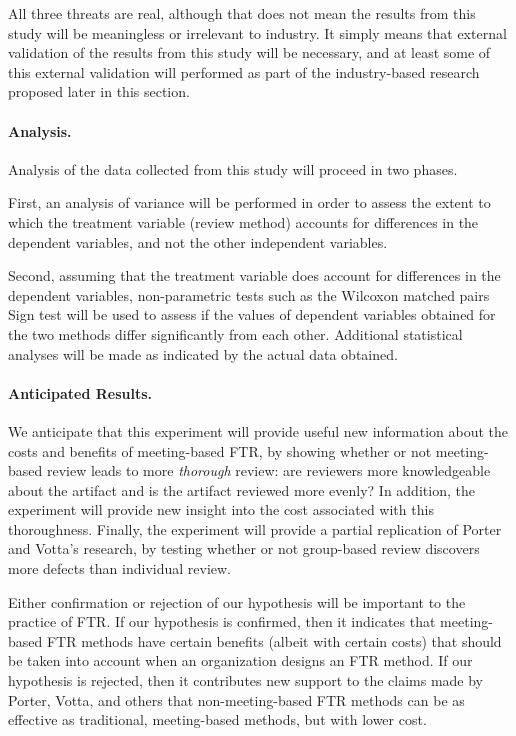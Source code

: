 All three threats are real, although that does not mean the results
from this study will be meaningless or irrelevant to industry.  It simply 
means that external validation of the results from this study will be
necessary, and at least some of this external validation will performed as 
part of the industry-based research proposed later in this section.

\paragraph {Analysis.}

Analysis of the data collected from this study will proceed in two
phases. 

First, an analysis of variance will be performed in order to assess the
extent to which the treatment variable (review method) accounts for
differences in the dependent variables, and not the other independent
variables.

Second, assuming that the treatment variable does account for differences
in the dependent variables, non-parametric tests such as the Wilcoxon
matched pairs Sign test will be used to assess if the values of dependent
variables obtained for the two methods differ significantly from each
other. Additional statistical analyses will be made as indicated by the
actual data obtained. 

\paragraph {Anticipated Results.}

We anticipate that this experiment will provide useful new information
about the costs and benefits of meeting-based FTR, by showing whether or
not meeting-based review leads to more {\em thorough} review: are reviewers
more knowledgeable about the artifact and is the artifact reviewed more
evenly?  In addition, the experiment will provide new insight into the
cost associated with this thoroughness.  Finally, the experiment will
provide a partial replication of Porter and Votta's research, by testing
whether or not group-based review discovers more defects than individual
review.   

Either confirmation or rejection of our hypothesis will be important to the
practice of FTR.  If our hypothesis is confirmed, then it indicates that
meeting-based FTR methods have certain benefits (albeit with certain costs)
that should be taken into account when an organization designs an FTR
method.  If our hypothesis is rejected, then it contributes new support to
the claims made by Porter, Votta, and others that non-meeting-based FTR 
methods can be as effective as traditional, meeting-based methods, but
with lower cost. 
















 













